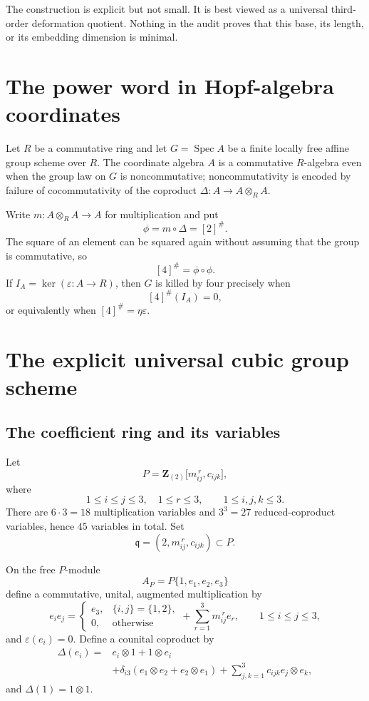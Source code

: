 \documentclass[11pt]{article}
\theoremstyle{remark}
\newcommand{\Z}{\mathbf Z}
\newcommand{\Spec}{\operatorname{Spec}}
\newcommand{\q}{\mathfrak q}
\newcommand{\eps}{\varepsilon}
\begin{document}
The construction is explicit but not small.  It is best viewed as a
universal third-order deformation quotient.  Nothing in the audit proves
that this base, its length, or its embedding dimension is minimal.

\section{The power word in Hopf-algebra coordinates}

Let \(R\) be a commutative ring and let \(G=\Spec A\) be a finite locally
free affine group scheme over \(R\).  The coordinate algebra \(A\) is a
commutative \(R\)-algebra even when the group law on \(G\) is noncommutative;
noncommutativity is encoded by failure of cocommutativity of the coproduct
\(\Delta:A\to A\otimes_R A\).

Write \(m:A\otimes_R A\to A\) for multiplication and put
\[
  \phi=m\circ\Delta=[2]^\#.
\]
The square of an element can be squared again without assuming that the group
is commutative, so
\[
  [4]^\#=\phi\circ\phi.
\]
If \(I_A=\ker(\eps:A\to R)\), then \(G\) is killed by four precisely when
\[
  [4]^\#(I_A)=0,
\]
or equivalently when \([4]^\#=\eta\eps\).

\section{The explicit universal cubic group scheme}

\subsection{The coefficient ring and its variables}

Let
\[
 P=\Z_{(2)}\bigl[m_{ij}^{\,r},c_{ijk}\bigr],
\]
where
\[
  1\le i\le j\le3,\quad 1\le r\le3,
  \qquad 1\le i,j,k\le3.
\]
There are \(6\cdot3=18\) multiplication variables and \(3^3=27\)
reduced-coproduct variables, hence \(45\) variables in total.  Set
\[
  \q=(2,m_{ij}^{\,r},c_{ijk})\subset P.
\]

On the free \(P\)-module
\[
  A_P=P\{1,e_1,e_2,e_3\}
\]
define a commutative, unital, augmented multiplication by
\begin{equation}\label{eq:multiplication}
 e_i e_j=
 \begin{cases}
   e_3,&\{i,j\}=\{1,2\},\\
   0,&\text{otherwise}
 \end{cases}
 +\sum_{r=1}^3m_{ij}^{\,r}e_r,
 \qquad 1\le i\le j\le3,
\end{equation}
and \(\eps(e_i)=0\).  Define a counital coproduct by
\begin{equation}\label{eq:coproduct}
\begin{split}
 \Delta(e_i)={}&e_i\otimes1+1\otimes e_i\\
 &+\delta_{i3}(e_1\otimes e_2+e_2\otimes e_1)
 +\sum_{j,k=1}^3c_{ijk}e_j\otimes e_k,
\end{split}
\end{equation}
and \(\Delta(1)=1\otimes1\).
\end{document}
